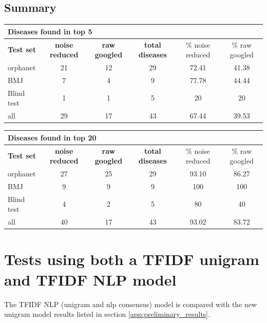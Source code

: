 \documentclass[10pt,letterpaper,final]{article}
\begin{document}
\subsection{Summary}
\label{app:summary_raw_reduced}

\begin{center}
\begin{small}
\begin{tabular}{l|cc||ccc}
	\multicolumn{6}{l}{\textbf{Diseases found in top 5}} \\ \hline
\textbf{Test set} & \textbf{noise reduced} &	\textbf{raw googled}	 &	\textbf{total diseases} &	\% noise reduced	 &\% raw googled \\ \hline
orphanet    &    21   &  12    & 29      & 72.41     & 41.38 \\
BMJ	        &    7   &   4   &    9   &  77.78    & 44.44 \\
Blind test	&   1    &   1   &    5   &   20   & 20 \\ \hline \hline
all	        &   29    &   17   &   43    &  67.44    & 39.53 \\ \hline
\end{tabular}
\end{small}
\end{center}

\begin{center}
\begin{small}
\begin{tabular}{l|cc||ccc}
	\multicolumn{6}{l}{\textbf{Diseases found in top 20}} \\ \hline
\textbf{Test set} & \textbf{noise reduced} &	\textbf{raw googled}	 &	\textbf{total diseases} &	\% noise reduced	 &\% raw googled \\ \hline
orphanet    &    27   &   25   &  29     &  93.10    & 86.27\\
BMJ	        &     9  &   9   &    9   &    100  & 100 \\
Blind test	&     4  &   2   &    5   &    80  & 40 \\ \hline \hline
all	        &    40   & 17     &   43    &   93.02   &  83.72 \\ \hline
\end{tabular}
\end{small}
\end{center}


\newpage
\section{Tests using both a TFIDF unigram and TFIDF NLP model}
\label{app:tfidf_tfidfrecalc}
The TFIDF NLP (unigram and nlp consensus) model is compared with the new
unigram model results listed in section \ref{app:preliminary_results}.
\end{document}
